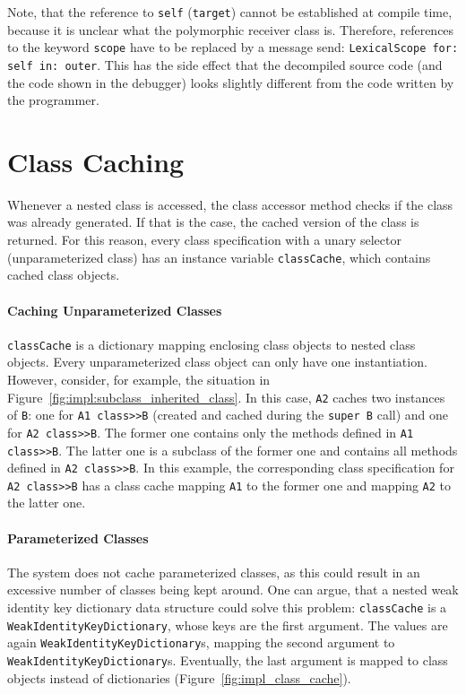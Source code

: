 Note, that the reference to \texttt{self} (\texttt{target}) cannot be established at compile time, because it is unclear what the polymorphic receiver class is. Therefore, references to the keyword \texttt{scope} have to be replaced by a message send: \texttt{LexicalScope for: self in: outer}. This has the side effect that the decompiled source code (and the code shown in the debugger) looks slightly different from the code written by the programmer.

\section{Class Caching}
\label{sec:impl_class_cache}
Whenever a nested class is accessed, the class accessor method checks if the class was already generated. If that is the case, the cached version of the class is returned. For this reason, every class specification with a unary selector (unparameterized class) has an instance variable \texttt{classCache}, which contains cached class objects. 

\paragraph{Caching Unparameterized Classes}
\texttt{classCache} is a dictionary mapping enclosing class objects to nested class objects. Every unparameterized class object can only have one instantiation. However, consider, for example, the situation in Figure~\ref{fig:impl:subclass_inherited_class}. In this case, \texttt{A2} caches two instances of \texttt{B}: one for \texttt{A1 class>>B} (created and cached during the \texttt{super B} call) and one for \texttt{A2 class>>B}. The former one contains only the methods defined in \texttt{A1 class>>B}. The latter one is a subclass of the former one and contains all methods defined in \texttt{A2 class>>B}. In this example, the corresponding class specification for \texttt{A2 class>>B} has a class cache mapping \texttt{A1} to the former one and mapping \texttt{A2} to the latter one.

\paragraph{Parameterized Classes}
The system does not cache parameterized classes, as this could result in an excessive number of classes being kept around. One can argue, that a nested weak identity key dictionary data structure could solve this problem: \texttt{classCache} is a \texttt{WeakIdentityKeyDictionary}, whose keys are the first argument. The values are again \texttt{WeakIdentityKeyDictionary}s, mapping the second argument to \texttt{WeakIdentityKeyDictionary}s. Eventually, the last argument is mapped to class objects instead of dictionaries (Figure~\ref{fig:impl_class_cache}).

